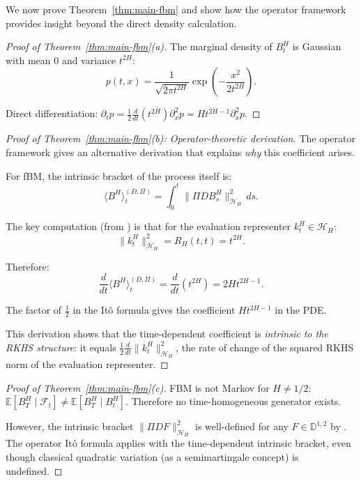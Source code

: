 \documentclass[11pt]{article}
\theoremstyle{definition}
\newcommand{\E}{\mathbb{E}}
\newcommand{\Hi}{\mathcal{H}}
\begin{document}
We now prove Theorem~\ref{thm:main-fbm} and show how the operator framework provides insight beyond the direct density calculation.

\begin{proof}[Proof of Theorem~\ref{thm:main-fbm}(a)]
The marginal density of $B^H_t$ is Gaussian with mean 0 and variance $t^{2H}$:
\begin{equation}
p(t,x) = \frac{1}{\sqrt{2\pi t^{2H}}} \exp\left(-\frac{x^2}{2t^{2H}}\right).
\end{equation}

Direct differentiation: $\partial_t p = \frac{1}{2}\frac{d}{dt}(t^{2H}) \partial_x^2 p = Ht^{2H-1} \partial_x^2 p$.
\end{proof}

\begin{proof}[Proof of Theorem~\ref{thm:main-fbm}(b): Operator-theoretic derivation]
The operator framework gives an alternative derivation that explains \emph{why} this coefficient arises.

For fBM, the intrinsic bracket of the process itself is:
\begin{equation}
\langle B^H \rangle^{(D,\Pi)}_t = \int_0^t \|\Pi D B^H_s\|^2_{\Hi_H} \, ds.
\end{equation}

The key computation (from \cite{PaperII}) is that for the evaluation representer $k^H_t \in \Hi_H$:
\begin{equation}
\|k^H_t\|^2_{\Hi_H} = R_H(t,t) = t^{2H}.
\end{equation}

Therefore:
\begin{equation}
\frac{d}{dt}\langle B^H \rangle^{(D,\Pi)}_t = \frac{d}{dt}(t^{2H}) = 2Ht^{2H-1}.
\end{equation}

The factor of $\frac{1}{2}$ in the It\^o formula gives the coefficient $Ht^{2H-1}$ in the PDE.

This derivation shows that the time-dependent coefficient is \emph{intrinsic to the RKHS structure}: it equals $\frac{1}{2}\frac{d}{dt}\|k^H_t\|^2_{\Hi_H}$, the rate of change of the squared RKHS norm of the evaluation representer.
\end{proof}

\begin{proof}[Proof of Theorem~\ref{thm:main-fbm}(c)]
FBM is not Markov for $H \neq 1/2$: $\E[B^H_T \mid \mathcal{F}_t] \neq \E[B^H_T \mid B^H_t]$. Therefore no time-homogeneous generator exists.

However, the intrinsic bracket $\|\Pi D F\|^2_{\Hi_H}$ is well-defined for any $F \in \mathbb{D}^{1,2}$ by \cite[Theorem 3.1]{PaperII}. The operator It\^o formula applies with the time-dependent intrinsic bracket, even though classical quadratic variation (as a semimartingale concept) is undefined.
\end{proof}
\end{document}
